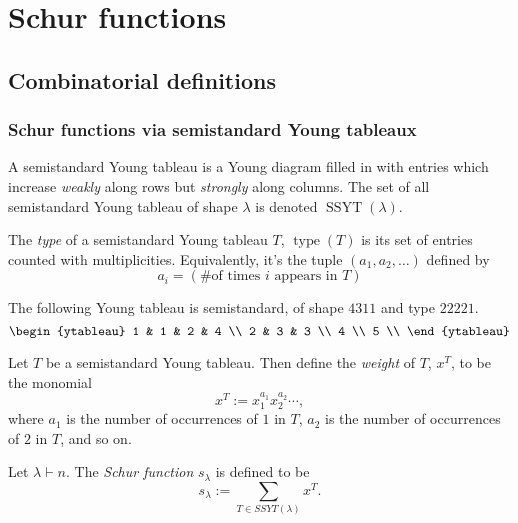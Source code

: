 \documentclass{article}
\DeclareMathOperator{\type}{type}
\DeclareMathOperator{\SSYT}{SSYT}
\begin{document}
\section{Schur functions}
\subsection{Combinatorial definitions}
\subsubsection{Schur functions via semistandard Young tableaux}

\begin{definition}
    A semistandard Young tableau is a Young diagram filled in with entries which increase \textit{weakly} along rows but \textit{strongly} along columns. 
    The set of all semistandard Young tableau of shape $\lambda$ is denoted $\SSYT(\lambda)$.

    The \textit{type} of a semistandard Young tableau $T$, $\type(T)$ is its set of entries counted with multiplicities. Equivalently, it's the tuple $(a_1, a_2, \ldots)$ defined by
    \[
        a_i = (\#\text{of times }i\text{ appears in }T)
    \]
\end{definition}

\begin{example}
    The following Young tableau is semistandard, of shape $4311$ and type $22221$.
    \[
        \begin{ytableau}
            1 & 1 & 2 & 4 \\
            2 & 3 & 3  \\
            4 \\
            5 \\ 
        \end{ytableau}
    \]
\end{example}

\begin{definition}
    Let $T$ be a semistandard Young tableau.  Then define the \textit{weight} of $T$, $x^T$, to be the monomial
    \[
        x^T := x_1^{a_1}x_2^{a_2}\cdots,
    \]
    where $a_1$ is the number of occurrences of $1$ in $T$, $a_2$ is the number of occurrences of $2$ in $T$, and so on.
\end{definition}

\begin{definition}
    Let $\lambda \vdash n$. The \textit{Schur function} $s_\lambda$ is defined to be
    \[
        s_\lambda := \sum_{T \in SSYT(\lambda)} x^T.
    \]
\end{definition}
\end{document}
